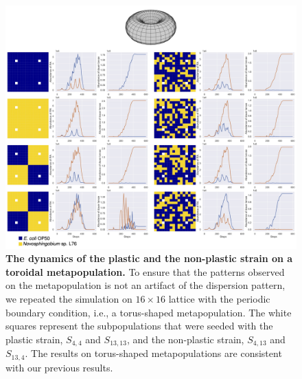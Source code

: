 \documentclass[10pt,letterpaper]{article}
\begin{document}
\begin{figure}
\begin{adjustwidth}{-2in}{0in}
    \begin{flushright}
\includegraphics[width=180mm]{figures/figureS4.jpg}
\caption{\textbf{The dynamics of the plastic and the non-plastic strain on a toroidal metapopulation.} To ensure that the patterns observed on the metapopulation is not an artifact of the dispersion pattern, we repeated the simulation on $16\times16$ lattice with the periodic boundary condition, i.e., a torus-shaped metapopulation. The white squares represent the subpopulations that were seeded with the plastic strain, $S_{4,4}$ and $S_{13,13}$, and the non-plastic strain, $S_{4,13}$ and $S_{13,4}$. The results on torus-shaped metapopulations are consistent with our previous results.}
\label{fig:figs4}
\end{flushright}
\end{adjustwidth}
\end{figure}
\end{document}
